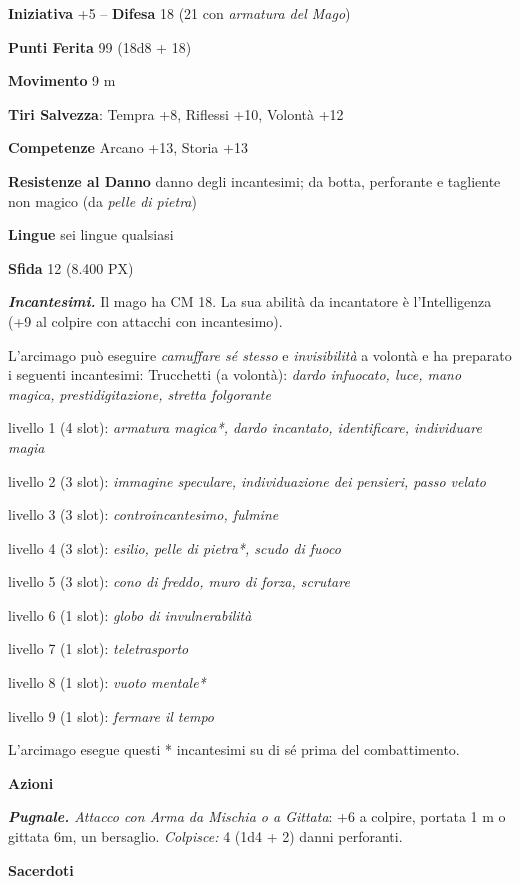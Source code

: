 \begin{multicols}{2}
\textbf{Iniziativa} +5 -- \textbf{Difesa} 18 (21 con \textit{armatura del Mago})

\textbf{Punti Ferita} 99 (18d8 + 18)

\textbf{Movimento} 9 m

\textbf{Tiri Salvezza}: Tempra +8, Riflessi +10, Volontà +12

\textbf{Competenze} Arcano +13, Storia +13

\textbf{Resistenze al Danno} danno degli incantesimi; da botta, perforante e tagliente non magico (da \textit{pelle di pietra})

\textbf{Lingue} sei lingue qualsiasi

\textbf{Sfida} 12 (8.400 PX)

\textit{\textbf{Incantesimi.}} Il mago ha CM 18. La sua abilità da incantatore è l'Intelligenza (+9 al colpire con attacchi con incantesimo).

L'arcimago può eseguire \textit{camuffare sé stesso} e \textit{invisibilità} a volontà e ha preparato i seguenti incantesimi: Trucchetti (a volontà): \textit{dardo infuocato, luce, mano magica,}
\textit{prestidigitazione, stretta folgorante}

livello 1 (4 slot): \textit{armatura magica*, dardo incantato, identificare, individuare magia}

livello 2 (3 slot): \textit{immagine speculare, individuazione dei pensieri, passo velato}

livello 3 (3 slot): \textit{controincantesimo, fulmine}

livello 4 (3 slot): \textit{esilio, pelle di pietra*, scudo di fuoco}

livello 5 (3 slot): \textit{cono di freddo, muro di forza, scrutare}

livello 6 (1 slot): \textit{globo di invulnerabilità}

livello 7 (1 slot): \textit{teletrasporto}

livello 8 (1 slot): \textit{vuoto mentale*}

livello 9 (1 slot): \textit{fermare il tempo}

L'arcimago esegue questi {*} incantesimi su di sé prima del combattimento.

\textbf{Azioni}

\textit{\textbf{Pugnale.} Attacco con Arma da Mischia o a Gittata}: +6 a colpire, portata 1 m o gittata 6m, un bersaglio. \textit{Colpisce:} 4 (1d4 + 2) danni perforanti.


\medskip\textbf{Sacerdoti}


\end{multicols}
